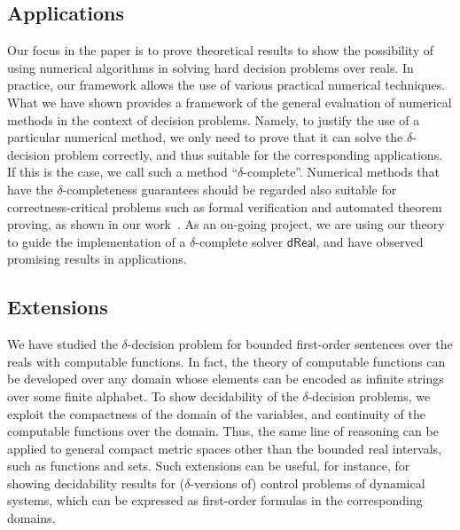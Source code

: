 \documentclass[prodmode]{acmsmall} %
\begin{document}

\subsection{Applications} 

Our focus in the paper is to prove theoretical results to show the possibility of using numerical algorithms in solving hard decision problems over reals. In practice, our framework allows the use of various practical numerical techniques. What we have shown provides a framework of the general evaluation of numerical methods in the context of decision problems. Namely, to justify the use of a particular numerical method, we only need to prove that it can solve the $\delta$-decision problem correctly, and thus suitable for the corresponding applications. If this is the case, we call such a method ``$\delta$-complete''. Numerical methods that have the $\delta$-completeness guarantees should be regarded also suitable for correctness-critical problems such as formal verification and automated theorem proving, as shown in our work~\cite{ijcar12,DBLP:conf/fmcad/Gao10}. As an on-going project, we are using our theory to guide the implementation of a $\delta$-complete solver $\mathsf{dReal}$, and have observed promising results in applications. 

\subsection{Extensions}

We have studied the $\delta$-decision problem for bounded first-order sentences over the reals with computable functions. In fact, the theory of computable functions can be developed over any domain whose elements can be encoded as infinite strings over some finite alphabet. To show decidability of the $\delta$-decision problems, we exploit the compactness of the domain of the variables, and continuity of the computable functions over the domain. Thus, the same line of reasoning can be applied to general compact metric spaces other than the bounded real intervals, such as functions and sets. Such extensions can be useful, for instance, for showing decidability results for ($\delta$-versions of) control problems of dynamical systems, which can be expressed as first-order formulas in the corresponding domains. 
\end{document}
